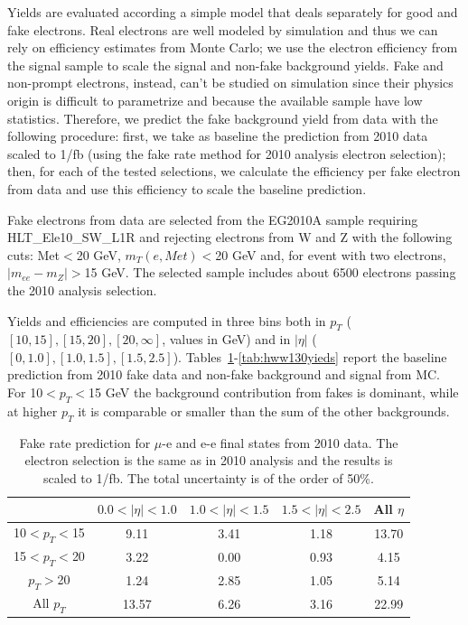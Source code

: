 Yields are evaluated according a simple model that deals separately for good and fake electrons.
Real electrons are well modeled by simulation and thus we can rely on efficiency estimates from Monte Carlo; 
we use the electron efficiency from the signal sample to scale the signal and non-fake background yields.
Fake and non-prompt electrons, instead, can't be studied on simulation since their physics origin is difficult to parametrize and because
the available sample have low statistics. 
Therefore, we predict the fake background yield from data with the following procedure: 
first, we take as baseline the prediction from 2010 data scaled to 1/fb (using the fake rate method for 2010 analysis electron selection); 
then, for each of the tested selections, we calculate the efficiency per fake electron from data and use this efficiency to scale the baseline prediction.

Fake electrons from data are selected from the EG2010A sample requiring HLT\_Ele10\_SW\_L1R and rejecting electrons from W and Z with the following cuts:
Met$<$20 GeV, $m_T(e, Met)<$20 GeV and, for event with two electrons, $|m_{ee}-m_Z|>$15 GeV. 
The selected sample includes about 6500 electrons passing the 2010 analysis selection.

Yields and efficiencies are computed in three bins both in $p_T$ ($[10,15],[15,20],[20,\infty]$, values in GeV) 
and in $|\eta|$ ($[0,1.0],[1.0,1.5],[1.5,2.5]$). 
Tables~\ref{tab:fakeBaseline}-\ref{tab:hww130yieds} report the baseline prediction from 2010 fake data and non-fake background and signal from MC.
For 10$<p_T<$15 GeV the background contribution from fakes is dominant, while at higher $p_T$ it is comparable or smaller than the sum of the other backgrounds.

\begin{table}[!ht]
\begin{center}
\begin{tabular}{|c|ccc|c|} \hline
 & $0.0<|\eta|<1.0$ & $1.0<|\eta|<1.5$ & $1.5<|\eta|<2.5$ & All $\eta$ \\ \hline
10$<p_T<$15 & 9.11 & 3.41 & 1.18 & 13.70 \\
15$<p_T<$20 & 3.22 & 0.00 & 0.93 & 4.15 \\
$p_T>$20 & 1.24 & 2.85 & 1.05 & 5.14 \\  \hline
All $p_T$ & 13.57 & 6.26 & 3.16 & 22.99 \\ \hline
\end{tabular}
\caption{Fake rate prediction for $\mu$-e and e-e final states from 2010 data. 
The electron selection is the same as in 2010 analysis and the results is scaled to 1/fb.
The total uncertainty is of the order of 50\%.
\label{tab:fakeBaseline}}
\end{center}
\end{table}

